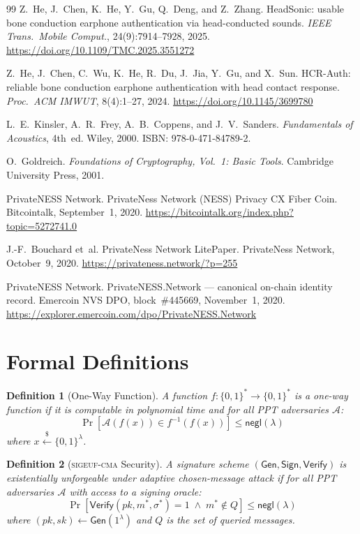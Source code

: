 \documentclass[12pt,a4paper]{article}
\newtheorem{definition}{Definition}
\begin{document}
\begin{thebibliography}{99}
Z.~He, J.~Chen, K.~He, Y.~Gu, Q.~Deng, and Z.~Zhang.
HeadSonic: usable bone conduction earphone authentication via
head-conducted sounds.
\textit{IEEE Trans.\ Mobile Comput.}, 24(9):7914--7928, 2025.
\url{https://doi.org/10.1109/TMC.2025.3551272}

Z.~He, J.~Chen, C.~Wu, K.~He, R.~Du, J.~Jia, Y.~Gu, and X.~Sun.
HCR-Auth: reliable bone conduction earphone authentication with head
contact response.
\textit{Proc.\ ACM IMWUT}, 8(4):1--27, 2024.
\url{https://doi.org/10.1145/3699780}

L.~E.~Kinsler, A.~R.~Frey, A.~B.~Coppens, and J.~V.~Sanders.
\textit{Fundamentals of Acoustics}, 4th~ed.
Wiley, 2000. ISBN: 978-0-471-84789-2.

O.~Goldreich.
\textit{Foundations of Cryptography, Vol.~1: Basic Tools}.
Cambridge University Press, 2001.

PrivateNESS Network.
PrivateNess Network (NESS) Privacy CX Fiber Coin.
Bitcointalk, September~1, 2020.
\url{https://bitcointalk.org/index.php?topic=5272741.0}

J.-F.~Bouchard et~al.
PrivateNess Network LitePaper.
PrivateNess Network, October~9, 2020.
\url{https://privateness.network/?p=255}

PrivateNESS Network.
PrivateNESS.Network --- canonical on-chain identity record.
Emercoin NVS DPO, block~\#445669, November~1, 2020.
\url{https://explorer.emercoin.com/dpo/PrivateNESS.Network}

\end{thebibliography}

\appendix

\section{Formal Definitions}

\begin{definition}[One-Way Function]
A function $f : \{0,1\}^* \to \{0,1\}^*$ is a \emph{one-way function}
if it is computable in polynomial time and for all \textsf{PPT}
adversaries $\mathcal{A}$:
\[
  \Pr\!\left[\mathcal{A}(f(x)) \in f^{-1}(f(x))\right]
  \leq \mathsf{negl}(\lambda)
\]
where $x \xleftarrow{\$} \{0,1\}^\lambda$.
\end{definition}

\begin{definition}[\textsc{sigeuf-cma} Security]
A signature scheme $(\mathsf{Gen}, \mathsf{Sign}, \mathsf{Verify})$ is
\emph{existentially unforgeable under adaptive chosen-message attack} if
for all \textsf{PPT} adversaries $\mathcal{A}$ with access to a signing
oracle:
\[
  \Pr\!\left[\mathsf{Verify}(pk, m^*, \sigma^*) = 1
  \;\wedge\; m^* \notin Q\right] \leq \mathsf{negl}(\lambda)
\]
where $(pk, sk) \leftarrow \mathsf{Gen}(1^\lambda)$ and $Q$ is the set
of queried messages.
\end{definition}
\end{document}
